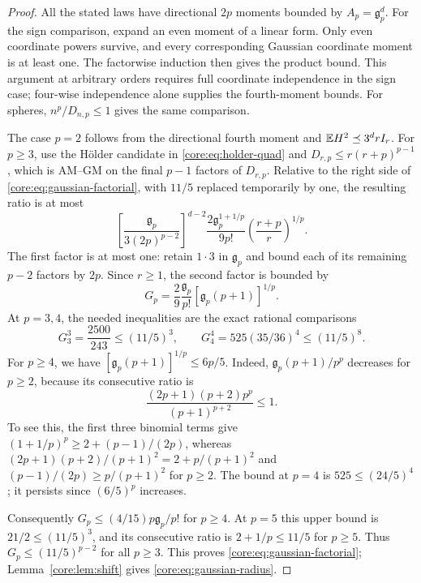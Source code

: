 \documentclass[11pt,a4paper]{article}
\theoremstyle{definition}\newtheorem{definition}[theorem]{Definition}
\theoremstyle{remark}\newtheorem{remark}[theorem]{Remark}
\numberwithin{equation}{section}
\newcommand{\gmom}{\mathfrak g}
\begin{document}
\begin{proof}
All the stated laws have directional $2p$ moments bounded by
$A_p=\gmom_p^d$. For the sign comparison, expand an even moment of a
linear form. Only even coordinate powers survive, and every
corresponding Gaussian coordinate moment is at least one. The
factorwise induction then gives the product bound. This argument at
arbitrary orders requires full coordinate independence in the sign
case; four-wise independence alone supplies the fourth-moment bounds.
For spheres, $n^p/D_{n,p}\le1$ gives the same comparison.

The case $p=2$ follows from the directional fourth moment and
$\mathbb E H^2\preceq3^drI_r$. For $p\ge3$, use the H\"older candidate
in \eqref{core:eq:holder-quad} and
$D_{r,p}\le r(r+p)^{p-1}$, which is AM--GM on the final $p-1$
factors of $D_{r,p}$. Relative to the right side of
\eqref{core:eq:gaussian-factorial}, with $11/5$ replaced temporarily
by one, the resulting ratio is at most
\[
 \left[\frac{\gmom_p}{3(2p)^{p-2}}\right]^{d-2}
 \frac{2\gmom_p^{1+1/p}}{9p!}
             \left(\frac{r+p}{r}\right)^{1/p}.
\]
The first factor is at most one: retain $1\cdot3$ in $\gmom_p$ and
bound each of its remaining $p-2$ factors by $2p$. Since $r\ge1$,
the second factor is bounded by
\[
 G_p=\frac29\frac{\gmom_p}{p!}
                         [\gmom_p(p+1)]^{1/p}.
\]
At $p=3,4$, the needed inequalities are the exact rational comparisons
\[
 G_3^3=\frac{2500}{243}\le(11/5)^3,
 \qquad G_4^4=525(35/36)^4\le(11/5)^8.
\]
For $p\ge4$, we have $[\gmom_p(p+1)]^{1/p}\le6p/5$.
Indeed, $\gmom_p(p+1)/p^p$ decreases for $p\ge2$, because its
consecutive ratio is
\[
 \frac{(2p+1)(p+2)p^p}{(p+1)^{p+2}}\le1.
\]
To see this, the first three binomial terms give
$(1+1/p)^p\ge2+(p-1)/(2p)$, whereas
$(2p+1)(p+2)/(p+1)^2=2+p/(p+1)^2$
and $(p-1)/(2p)\ge p/(p+1)^2$ for $p\ge2$.
The bound at $p=4$ is $525\le(24/5)^4$; it persists since
$(6/5)^p$ increases.

Consequently $G_p\le(4/15)p\gmom_p/p!$ for $p\ge4$.
At $p=5$ this upper bound is $21/2\le(11/5)^3$, and its
consecutive ratio is $2+1/p\le11/5$ for $p\ge5$.
Thus $G_p\le(11/5)^{p-2}$ for all $p\ge3$.
This proves \eqref{core:eq:gaussian-factorial};
Lemma~\ref{core:lem:shift} gives \eqref{core:eq:gaussian-radius}.
\end{proof}
\end{document}
